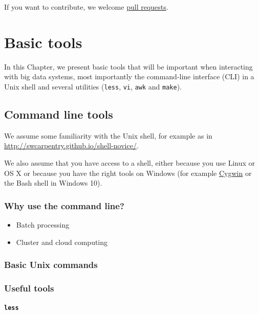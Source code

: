 \documentclass[]{book}
\theoremstyle{definition}
\theoremstyle{definition}
\theoremstyle{definition}
\theoremstyle{remark}
\begin{document}
If you want to contribute, we welcome
\href{https://help.github.com/articles/about-pull-requests/}{pull
requests}.

\chapter{Basic tools}\label{basics}

In this Chapter, we present basic tools that will be important when
interacting with big data systems, most importantly the command-line
interface (CLI) in a Unix shell and several utilities (\texttt{less},
\texttt{vi}, \texttt{awk} and \texttt{make}).

\section{Command line tools}\label{command-line-tools}

We assume some familiarity with the Unix shell, for example as in
\url{http://swcarpentry.github.io/shell-novice/}.

We also assume that you have access to a shell, either because you use
Linux or OS X or because you have the right tools on Windows (for
example \href{https://www.cygwin.com/}{Cygwin} or the Bash shell in
Windows 10).

\subsection{Why use the command line?}\label{why-use-the-command-line}

\begin{itemize}
\item
  Batch processing
\item
  Cluster and cloud computing
\end{itemize}

\subsection{Basic Unix commands}\label{basic-unix-commands}

\subsection{Useful tools}\label{useful-tools}

\subsubsection{\texorpdfstring{\texttt{less}}{less}}\label{less}
\end{document}
